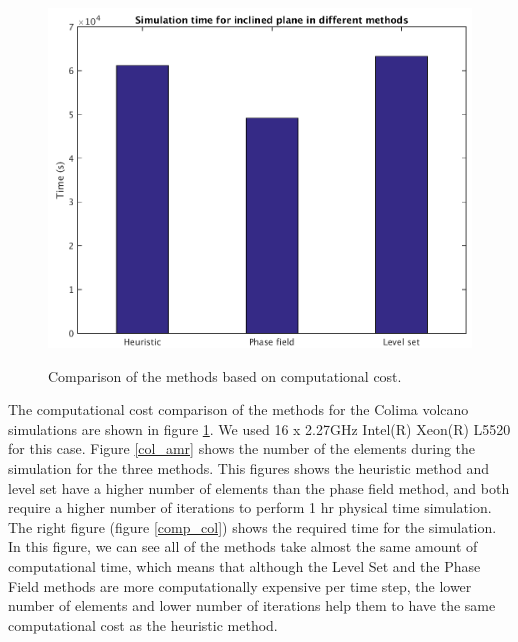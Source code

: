 \documentclass[review]{elsarticle}
\begin{document}
\begin{figure}[H]
\begin{minipage}[b]{.5\linewidth}
        \end{minipage}
        \begin{minipage}[b]{.5 \linewidth}
                \centering
                \includegraphics[width=1\textwidth]{IMAGES/colima_timing1.png}
                \label{comp_col}
        \end{minipage}
        \caption{Comparison of the methods based on computational cost.}
        \label{compinc}
\end{figure}

The computational cost comparison of the methods for the Colima volcano simulations are shown in figure \ref{compinc}. 
We used 16 x 2.27GHz Intel(R) Xeon(R) L5520 for this case. Figure \ref{col_amr} shows the number of the elements during the simulation for the three methods.  
This figures shows the heuristic method and level set have a higher number of elements than the phase field method, 
and both require a higher number of iterations to perform 1 hr physical time simulation. 
The right figure (figure \ref{comp_col}) shows the required time for the simulation. 
In this figure, we can see all of the methods take almost the same amount of computational time, which means that although the 
Level Set and the Phase Field methods are more computationally expensive per time step, the lower number of elements and lower
number of iterations help them to have the same computational cost as the heuristic method.  
\end{document}
